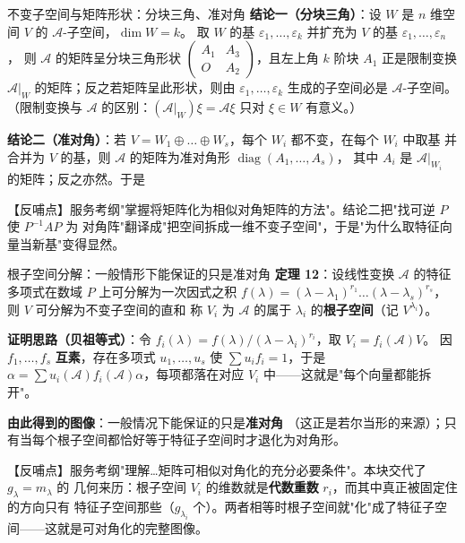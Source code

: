 \begin{fdeep}{不变子空间与矩阵形状：分块三角、准对角}
\textbf{结论一（分块三角）}：设 $W$ 是 $n$ 维空间 $V$ 的 $\mathscr{A}$-子空间，$\dim W=k$。
取 $W$ 的基 $\varepsilon_1,\dots,\varepsilon_k$ 并扩充为 $V$ 的基 $\varepsilon_1,\dots,\varepsilon_n$，
则 $\mathscr{A}$ 的矩阵呈分块三角形状 $\begin{pmatrix}A_1&A_3\\O&A_2\end{pmatrix}$，且左上角 $k$ 阶块
$A_1$ 正是限制变换 $\mathscr{A}|_W$ 的矩阵；反之若矩阵呈此形状，则由 $\varepsilon_1,\dots,\varepsilon_k$
生成的子空间必是 $\mathscr{A}$-子空间。（限制变换与 $\mathscr{A}$ 的区别：$(\mathscr{A}|_W)\xi=\mathscr{A}\xi$
只对 $\xi\in W$ 有意义。）

\textbf{结论二（准对角）}：若 $V=W_1\oplus\dots\oplus W_s$，每个 $W_i$ 都不变，在每个 $W_i$ 中取基
并合并为 $V$ 的基，则 $\mathscr{A}$ 的矩阵为准对角形 $\operatorname{diag}(A_1,\dots,A_s)$，
其中 $A_i$ 是 $\mathscr{A}|_{W_i}$ 的矩阵；反之亦然。于是

【反哺点】服务考纲"掌握将矩阵化为相似对角矩阵的方法"。结论二把"找可逆 $P$ 使 $P^{-1}AP$ 为
对角阵"翻译成"把空间拆成一维不变子空间"，于是"为什么取特征向量当新基"变得显然。
\end{fdeep}

\begin{fdeep}{根子空间分解：一般情形下能保证的只是准对角}
\textbf{定理 12}：设线性变换 $\mathscr{A}$ 的特征多项式在数域 $P$ 上可分解为一次因式之积
$f(\lambda)=(\lambda-\lambda_1)^{r_1}\dots(\lambda-\lambda_s)^{r_s}$，则 $V$ 可分解为不变子空间的直和
称 $V_i$ 为 $\mathscr{A}$ 的属于 $\lambda_i$ 的\textbf{根子空间}（记 $V^{\lambda_i}$）。

\textbf{证明思路（贝祖等式）}：令 $f_i(\lambda)=f(\lambda)/(\lambda-\lambda_i)^{r_i}$，取 $V_i=f_i(\mathscr{A})V$。
因 $f_1,\dots,f_s$ \textbf{互素}，存在多项式 $u_1,\dots,u_s$ 使 $\sum u_if_i=1$，于是
$\alpha=\sum u_i(\mathscr{A})f_i(\mathscr{A})\alpha$，每项都落在对应 $V_i$ 中——这就是"每个向量都能拆开"。

\textbf{由此得到的图像}：一般情况下能保证的只是\textbf{准对角}
（这正是若尔当形的来源）；只有当每个根子空间都恰好等于特征子空间时才退化为对角形。

【反哺点】服务考纲"理解…矩阵可相似对角化的充分必要条件"。本块交代了 $g_\lambda=m_\lambda$ 的
几何来历：根子空间 $V_i$ 的维数就是\textbf{代数重数} $r_i$，而其中真正被固定住的方向只有
特征子空间那些（$g_{\lambda_i}$ 个）。两者相等时根子空间就"化"成了特征子空间——这就是可对角化的完整图像。
\end{fdeep}

